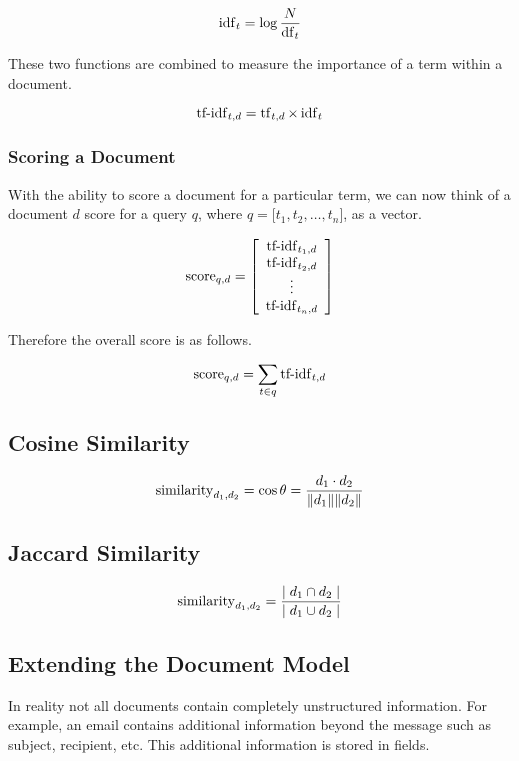 			$$\operatorname{idf}_t = \log{\frac{N}{\operatorname{df}_t}}$$
		
		These two functions are combined to measure the importance of a term within a document.
		
		$$\operatorname{tf-idf}_{t, d} = \operatorname{tf}_{t, d} \times \operatorname{idf}_t$$
		
		\subsubsection{Scoring a Document}
			With the ability to score a document for a particular term, we can now think of a document $d$ score for a query $q$, where $q = \lbrack t_1, t_2, \ldots, t_n\rbrack$, as a vector.
			
			$$
				\mathrm{score}_{q, d} = 
				\left[
				\begin{array}{c}
					\operatorname{tf-idf}_{t_1, d} \\
					\operatorname{tf-idf}_{t_2, d} \\
					\vdots \\
					\operatorname{tf-idf}_{t_n, d}
				\end{array}
				\right]
			$$
			
			Therefore the overall score is as follows.
			
			$$\operatorname{score}_{q, d} = \sum_{t \in q} \operatorname{tf-idf}_{t, d}$$
		
	\subsection{Cosine Similarity}
		$$\operatorname{similarity}_{d_1, d_2} = \cos{\theta} = \frac{d_1 \cdot d_2}{\lVert d_1\rVert\lVert d_2\rVert}$$
	
	\subsection{Jaccard Similarity}
		$$\operatorname{similarity}_{d_1, d_2} = \frac{\mid d_1 \cap d_2\mid}{\mid d_1 \cup d_2\mid}$$
	
	\subsection{Extending the Document Model}
		In reality not all documents contain completely unstructured information.  For example, an email contains additional information beyond the message such as subject, recipient, etc.  This additional information is stored in fields.
		
